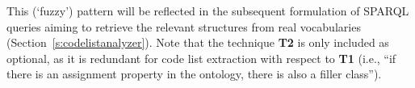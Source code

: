 This (`fuzzy') pattern will be reflected in the subsequent formulation of SPARQL queries aiming to retrieve the relevant structures from real vocabularies (Section~\ref{s:codelistanalyzer}).
Note that the technique \textbf{T2} is only included as optional, as it is redundant for code list extraction with respect to \textbf{T1} (i.e., ``if there is an assignment property in the ontology, there is also a filler class''). 
